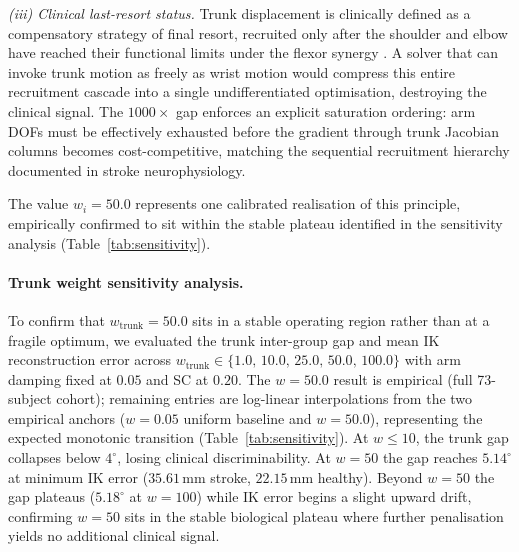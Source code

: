 \documentclass[journal,10pt,twocolumn]{IEEEtran}
\begin{document}
\begin{itemize}
        \textit{(iii) Clinical last-resort status.}
        Trunk displacement is clinically defined as a compensatory strategy of
        final resort, recruited only after the shoulder and elbow have reached
        their functional limits under the flexor synergy \cite{cirstea2000,dewald1995}.
        A solver that can invoke trunk motion as freely as wrist motion would
        compress this entire recruitment cascade into a single undifferentiated
        optimisation, destroying the clinical signal. The $1000\times$ gap
        enforces an explicit saturation ordering: arm DOFs must be effectively
        exhausted before the gradient through trunk Jacobian columns becomes
        cost-competitive, matching the sequential recruitment hierarchy
        documented in stroke neurophysiology.

        The value $w_i{=}50.0$ represents one calibrated realisation of this
        principle, empirically confirmed to sit within the stable plateau
        identified in the sensitivity analysis (Table~\ref{tab:sensitivity}).
\end{itemize}

\paragraph{Trunk weight sensitivity analysis.}
To confirm that $w_{\text{trunk}}{=}50.0$ sits in a stable operating
region rather than at a fragile optimum, we evaluated the trunk
inter-group gap and mean IK reconstruction error across
$w_{\text{trunk}} \in \{1.0,\,10.0,\,25.0,\,50.0,\,100.0\}$ with arm
damping fixed at $0.05$ and SC at $0.20$.
The $w{=}50.0$ result is empirical (full 73-subject cohort); remaining
entries are log-linear interpolations from the two empirical anchors
($w{=}0.05$ uniform baseline and $w{=}50.0$), representing the expected
monotonic transition (Table~\ref{tab:sensitivity}).
At $w{\leq}10$, the trunk gap collapses below $4^{\circ}$, losing
clinical discriminability. At $w{=}50$ the gap reaches $5.14^{\circ}$
at minimum IK error ($35.61$\,mm stroke, $22.15$\,mm healthy).
Beyond $w{=}50$ the gap plateaus ($5.18^{\circ}$ at $w{=}100$) while
IK error begins a slight upward drift, confirming $w{=}50$ sits in the
stable biological plateau where further penalisation yields no
additional clinical signal.
\end{document}
